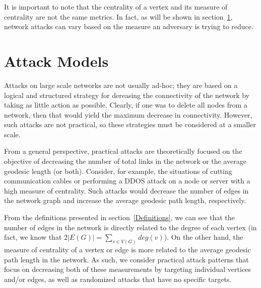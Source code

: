 \documentclass[doc]{apa}%
\begin{document}
It is important to note that the centrality of a vertex and its measure of centrality are not the same metrics. In fact, as will be shown in section~\ref{AttackStrategies}, network attacks can vary based on the measure an adversary is trying to reduce. 




\section{Attack Models}
\label{AttackStrategies}
Attacks on large scale networks are not usually ad-hoc; they are based on a logical and structured strategy for dereasing the connectivity of the network by taking as little action as possible. Clearly, if one was to delete all nodes from a network, then that would yield the maximum decrease in connectivity. However, such attacks are not practical, so these strategies must be considered at a smaller scale. 

From a general perspective, practical attacks are theoretically focused on the objective of decreasing the number of total links in the network or the average geodesic length (or both). Consider, for example, the situations of cutting communication cables or performing a DDOS attack on a node or server with a high measure of centrality. Such attacks would decrease the number of edges in the network graph and increase the average geodesic path length, respectively. 

From the definitions presented in section~\ref{Definitions}, we can see that the number of edges in the network is directly related to the degree of each vertex (in fact, we know that $2|E(G)| =\sum_{v \in V(G)}deg(v)$). On the other hand, the measure of centrality of a vertex or edge is more related to the average geodesic path length in the network. As such, we consider practical attack patterns that focus on decreasing both of these measurements by targeting individual vertices and/or edges, as well as randomized attacks that have no specific targets. 
\end{document}
